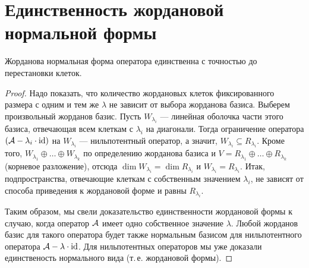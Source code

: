 \section{Единственность жордановой нормальной формы}

\begin{theorem}
    Жорданова нормальная форма оператора единственна с точностью до перестановки клеток.
\end{theorem}

\begin{proof}
    Надо показать, что количество жордановых клеток фиксированного размера с одним и тем же $\lambda$ не зависит от выбора жорданова базиса. Выберем произвольный жорданов базис. Пусть $W_{\lambda_i}$ --- линейная оболочка части этого базиса, отвечающая всем клеткам с $\lambda_i$ на диагонали. Тогда ограничение оператора $(\mathcal{A} - \lambda_i \cdot \mathrm{id})$ на $W_{\lambda_i}$ --- нильпотентный оператор, а значит, $W_{\lambda_i} \subseteq R_{\lambda_i}$. Кроме того, $W_{\lambda_1} \oplus \ldots \oplus W_{\lambda_k}$ по определению жорданова базиса и $V = R_{\lambda_1} \oplus \ldots \oplus R_{\lambda_k}$ (корневое разложение), отсюда $\dim W_{\lambda_i} = \dim R_{\lambda_i}$ и $W_{\lambda_i} = R_{\lambda_i}$. Итак, подпространства, отвечающие клеткам с собственным значением $\lambda_i$, не зависят от способа приведения к жордановой форме и равны $R_{\lambda_i}$.

    Таким образом, мы свели доказательство единственности жордановой формы к случаю, когда оператор $\mathcal{A}$ имеет одно собственное значение $\lambda$. Любой жорданов базис для такого оператора будет также нормальным базисом для нильпотентного оператора $\mathcal{A} - \lambda \cdot \mathrm{id}$. Для нильпотентных операторов мы уже доказали единственость нормального вида (т.\,е. жордановой формы).
\end{proof}

